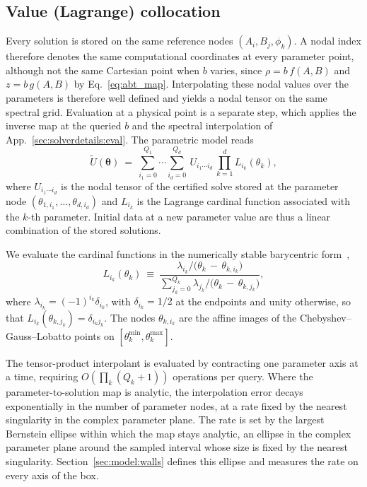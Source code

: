 \documentclass[
  aps,
  prd,
  twocolumn,
  10pt,
  amsmath,
  amssymb,
  nofootinbib,
  superscriptaddress,
  floatfix,
]{revtex4-2}
\newcommand{\vect}[1]{\boldsymbol{#1}}
\begin{document}
\subsection{Value (Lagrange) collocation}
\label{sec:param:interp}

Every solution is stored on the same reference nodes $(A_i,B_j,\phi_k)$.
A nodal index therefore denotes the same computational coordinates at every parameter point, although not the same Cartesian point when $b$ varies, since $\rho=b\,f(A,B)$ and $z=b\,g(A,B)$ by Eq.~\eqref{eq:abt_map}.
Interpolating these nodal values over the parameters is therefore well defined and yields a nodal tensor on the same spectral grid.
Evaluation at a physical point is a separate step, which applies the inverse map at the queried $b$ and the spectral interpolation of App.~\ref{sec:solverdetails:eval}.
The parametric model reads
\begin{equation}
  \tilde{U}(\vect{\theta}) \ = \
  \sum_{i_1=0}^{Q_1}\!\cdots\!\sum_{i_d=0}^{Q_d} \
  U_{i_1\cdots i_d} \,
  \prod_{k=1}^{d}
  L_{i_k}(\theta_k),
  \label{eq:surrogate}
\end{equation}
where $U_{i_1\cdots i_d}$ is the nodal tensor of the certified solve stored at
the parameter node
$(\theta_{1,i_1},\dots,\theta_{d,i_d})$ and $L_{i_k}$ is the
Lagrange cardinal function associated with the $k$-th parameter.
Initial data at a new parameter value are thus a linear combination of the stored solutions.


We evaluate the cardinal functions in the numerically stable barycentric
form~\cite{Trefethen2019},
\begin{equation}
  L_{i_k}(\theta_{k})
  \ \equiv \
  \frac{\displaystyle \lambda_{i_{k}}/\big(\theta_k \, - \, \theta_{k,i_{k}}\big)}
       {\displaystyle \sum_{j_{k}=0}^{Q_k}\lambda_{j_{k}}/\big(\theta_k \, - \, \theta_{k,j_{k}}\big)},
  \label{eq:barycentric}
\end{equation}
where $\lambda_{i_k}=(-1)^{i_k}\delta_{i_k}$, with
$\delta_{i_k}=1/2$ at the endpoints and unity otherwise, so that
$L_{i_k}(\theta_{k,j_k})=\delta_{i_kj_k}$.
The nodes $\theta_{k,i_k}$ are the affine images of the
Chebyshev--Gauss--Lobatto points on
$[\theta_k^{\min},\theta_k^{\max}]$.


The tensor-product interpolant is evaluated by contracting one parameter axis at a time, requiring $O(\prod_k(Q_k+1))$ operations per query.
Where the parameter-to-solution map is analytic, the
interpolation error decays exponentially in the number of parameter nodes, at a
rate fixed by the nearest singularity in the complex parameter plane.
The rate is set by the largest Bernstein ellipse within which the map stays analytic, an ellipse in the complex parameter plane around the sampled interval whose size is fixed by the nearest singularity.
Section~\ref{sec:model:walls} defines this ellipse and measures the rate on every axis of the box.
\end{document}
